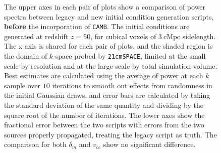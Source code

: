 \documentclass[floats,floatfix,showpacs,amssymb,prd,superscriptaddress,nofootinbib]{revtex4-2} %
\newcommand{\code}{\texttt}
\begin{document}
\begin{figure}[H]
\begin{subfigure}[b]{0.9\textwidth}
         \label{fig:compare_generators_power_spectrum_noCAMB_vbc}
     \end{subfigure}
        \caption{The upper axes in each pair of plots show a comparison of power spectra between legacy and new initial condition generation scripts, \textbf{before} the incorporation of \code{CAMB}. The initial conditions are generated at redshift $z = 50$, for cubical voxels of $3 ~\text{cMpc}$ sidelength. The x-axis is shared for each pair of plots, and the shaded region is the domain of $k$-space probed by \code{21cmSPACE}, limited at the small scale by resolution and at the large scale by total simulation volume. Best estimates are calculated using the average of power at each $k$ sample over $10$ iterations to smooth out effects from randomness in the initial Gaussian draws, and error bars are calculated by taking the standard deviation of the same quantity and dividing by the square root of the number of iterations. The lower axes show the fractional error between the two scripts with errors from the two sources properly propagated, treating the legacy script as truth. The comparison for both $\delta_m$ and $v_{bc}$ show no significant difference.}
        \label{fig:compare_generators_noCAMB}
\end{figure}
\end{document}
